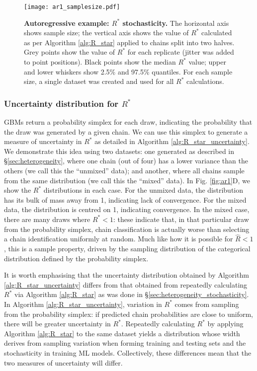 \documentclass{article}
\begin{document}
\begin{figure}[!htb]
	\centerline{\texttt{[image: ar1\_samplesize.pdf]}}
	\caption{\textbf{Autoregressive example: $R^*$ stochasticity.} The horizontal axis shows sample size; the vertical axis shows the value of $R^*$ calculated as per Algorithm \ref{alg:R_star} applied to chains split into two halves. Grey points show the value of $R^*$ for each replicate (jitter was added to point positions). Black points show the median $R^*$ value; upper and lower whiskers show 2.5\% and 97.5\% quantiles. For each sample size, a single dataset was created and used for all $R^*$ calculations.}
	\label{fig:ar1_samplesize}
\end{figure}

\subsubsection{Uncertainty distribution for $R^*$}\label{sec:heterogeneity_uncertainty}
GBMs return a probability simplex for each draw, indicating the probability that the draw was generated by a given chain. We can use this simplex to generate a measure of uncertainty in $R^*$ as detailed in Algorithm \ref{alg:R_star_uncertainty}. We demonstrate this idea using two datasets: one generated as described in \S\ref{sec:heterogeneity}, where one chain (out of four) has a lower variance than the others (we call this the ``unmixed'' data); and another, where all chains sample from the same distribution (we call this the ``mixed'' data). In Fig. \ref{fig:ar1}D, we show the $R^*$ distributions in each case. For the unmixed data, the distribution has its bulk of mass away from 1, indicating lack of convergence. For the mixed data, the distribution is centred on 1, indicating convergence. In the mixed case, there are many draws where $R^*<1$: these indicate that, in that particular draw from the probability simplex, chain classification is actually worse than selecting a chain identification uniformly at random. Much like how it is possible for $\hat{R}<1$, this is a sample property, driven by the sampling distribution of the categorical distribution defined by the probability simplex.

It is worth emphasising that the uncertainty distribution obtained by Algorithm \ref{alg:R_star_uncertainty} differs from that obtained from repeatedly calculating $R^*$ via Algorithm \ref{alg:R_star} as was done in \S\ref{sec:heterogeneity_stochasticity}. In Algorithm \ref{alg:R_star_uncertainty}, variation in $R^*$ comes from sampling from the probability simplex: if predicted chain probabilities are close to uniform, there will be greater uncertainty in $R^*$. Repeatedly calculating $R^*$ by applying Algorithm \ref{alg:R_star} to the same dataset yields a distribution whose width derives from sampling variation when forming training and testing sets and the stochasticity in training ML models. Collectively, these differences mean that the two measures of uncertainty will differ.
\end{document}
